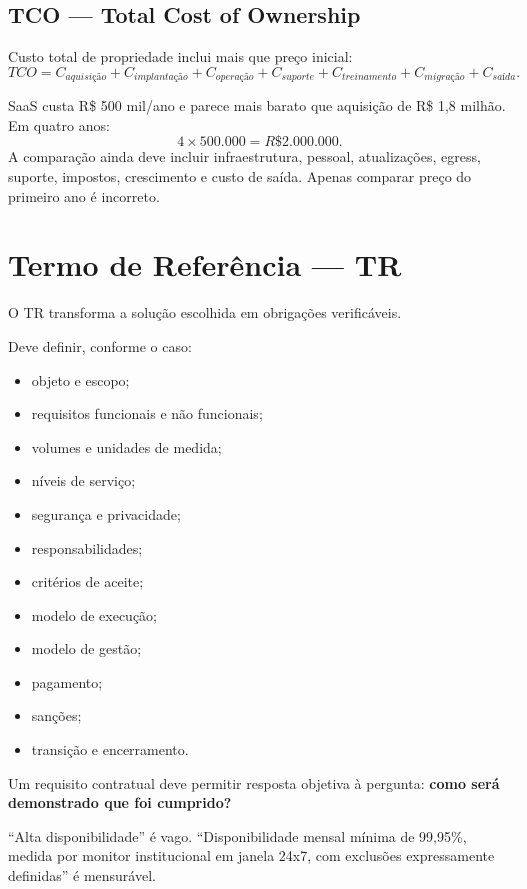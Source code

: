 \subsection{TCO — Total Cost of Ownership}

Custo total de propriedade inclui mais que preço inicial:
\[
TCO=C_{aquisição}+C_{implantação}+C_{operação}+C_{suporte}+C_{treinamento}+C_{migração}+C_{saída}.
\]

\begin{exemplo}
SaaS custa R\$ 500 mil/ano e parece mais barato que aquisição de R\$ 1,8 milhão. Em quatro anos:
\[
4\times500.000=R\$2.000.000.
\]
A comparação ainda deve incluir infraestrutura, pessoal, atualizações, egress, suporte, impostos, crescimento e custo de saída. Apenas comparar preço do primeiro ano é incorreto.
\end{exemplo}

\section{Termo de Referência — TR}

O TR transforma a solução escolhida em obrigações verificáveis.

Deve definir, conforme o caso:
\begin{itemize}
\item objeto e escopo;
\item requisitos funcionais e não funcionais;
\item volumes e unidades de medida;
\item níveis de serviço;
\item segurança e privacidade;
\item responsabilidades;
\item critérios de aceite;
\item modelo de execução;
\item modelo de gestão;
\item pagamento;
\item sanções;
\item transição e encerramento.
\end{itemize}

\begin{teoria}[verificabilidade]
Um requisito contratual deve permitir resposta objetiva à pergunta: \textbf{como será demonstrado que foi cumprido?}

``Alta disponibilidade'' é vago. ``Disponibilidade mensal mínima de 99,95\%, medida por monitor institucional em janela 24x7, com exclusões expressamente definidas'' é mensurável.
\end{teoria}

